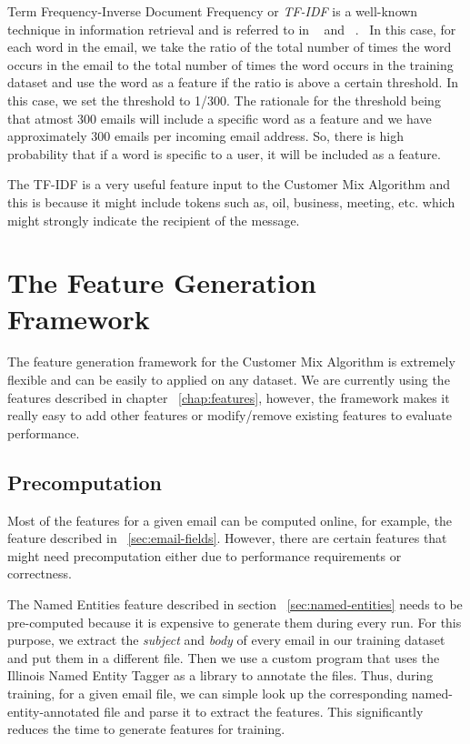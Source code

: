 \documentclass[senior,oneside]{UIUC}
\begin{document}
Term Frequency-Inverse Document Frequency or \emph{TF-IDF} is a well-known technique in information retrieval and is referred to in ~\cite{idf} and ~\cite{tf-idf}. \
In this case, for each word in the email, we take the ratio of the total number of times the word occurs in the email to the total number of times the word occurs in the training dataset and use the word as a feature if the ratio is above a certain threshold. In this case, we set the threshold to 1/300. The rationale for the threshold being that atmost 300 emails will include a specific word as a feature and we have approximately 300 emails per incoming email address. So, there is high probability that if a word is specific to a user, it will be included as a feature.

The TF-IDF is a very useful feature input to the Customer Mix Algorithm and this is because it might include tokens such as, oil, business, meeting, etc. which might strongly indicate the recipient of the message.


\chapter{The Feature Generation Framework}

The feature generation framework for the Customer Mix Algorithm is extremely flexible and can be easily to applied on any dataset. We are currently using the features described in chapter ~\ref{chap:features}, however, the framework makes it really easy to add other features or modify/remove existing features to evaluate performance.

\section{Precomputation}

Most of the features for a given email can be computed online, for example, the feature described in ~\ref{sec:email-fields}. However, there are certain features that might need precomputation either due to performance requirements or correctness.

The Named Entities feature described in section ~\ref{sec:named-entities} needs to be pre-computed because it is expensive to generate them during every run. For this purpose, we extract the \emph{subject} and \emph{body} of every email in our training dataset and put them in a different file. Then we use a custom program that uses the Illinois Named Entity Tagger as a library to annotate the files. Thus, during training, for a given email file, we can simple look up the corresponding named-entity-annotated file and parse it to extract the features. This significantly reduces the time to generate features for training.
\end{document}
